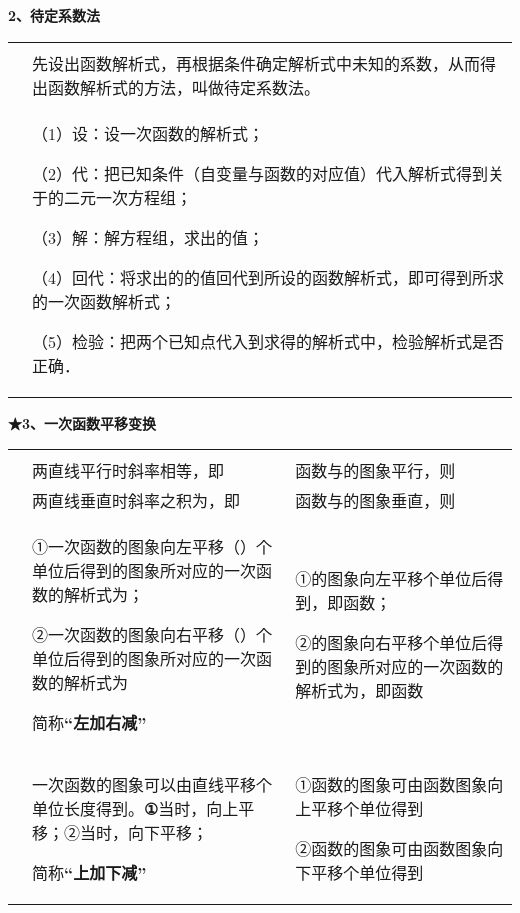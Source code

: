 \textbf{2、待定系数法}

\begin{longtable}[]{@{}ll@{}}
\toprule
\endhead
&\tabularnewline
&
先设出函数解析式，再根据条件确定解析式中未知的系数，从而得出函数解析式的方法，叫做待定系数法。\tabularnewline
\begin{minipage}[t]{0.47\columnwidth}\raggedright
\strut
\end{minipage} & \begin{minipage}[t]{0.47\columnwidth}\raggedright
（1）设：设一次函数的解析式；

（2）代：把已知条件（自变量与函数的对应值）代入解析式得到关于的二元一次方程组；

（3）解：解方程组，求出的值；

（4）回代：将求出的的值回代到所设的函数解析式，即可得到所求的一次函数解析式；

（5）检验：把两个已知点代入到求得的解析式中，检验解析式是否正确．\strut
\end{minipage}\tabularnewline
\bottomrule
\end{longtable}

\textbf{★3、一次函数平移变换}

\begin{longtable}[]{@{}lll@{}}
\toprule
\endhead
& &\tabularnewline
& 两直线平行时斜率相等，即 & 函数与的图象平行，则\tabularnewline
& 两直线垂直时斜率之积为，即 & 函数与的图象垂直，则\tabularnewline
\begin{minipage}[t]{0.30\columnwidth}\raggedright
\strut
\end{minipage} & \begin{minipage}[t]{0.30\columnwidth}\raggedright
①一次函数的图象向左平移（）个单位后得到的图象所对应的一次函数的解析式为；

②一次函数的图象向右平移（）个单位后得到的图象所对应的一次函数的解析式为

简称\textbf{``左加右减''}\strut
\end{minipage} & \begin{minipage}[t]{0.30\columnwidth}\raggedright
①的图象向左平移个单位后得到，即函数；

②的图象向右平移个单位后得到的图象所对应的一次函数的解析式为，即函数\strut
\end{minipage}\tabularnewline
\begin{minipage}[t]{0.30\columnwidth}\raggedright
\strut
\end{minipage} & \begin{minipage}[t]{0.30\columnwidth}\raggedright
一次函数的图象可以由直线平移个单位长度得到。\textbf{①}当时，向上平移；②当时，向下平移；

简称\textbf{``上加下减''}\strut
\end{minipage} & \begin{minipage}[t]{0.30\columnwidth}\raggedright
①函数的图象可由函数图象向上平移个单位得到

②函数的图象可由函数图象向下平移个单位得到\strut
\end{minipage}\tabularnewline
\bottomrule
\end{longtable}

